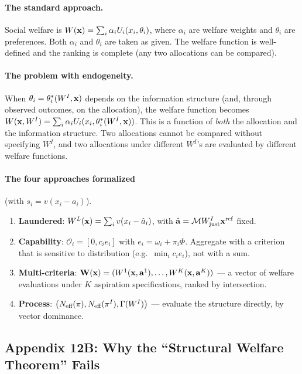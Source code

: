 \documentclass[../structural_economics_book.tex]{subfiles}
\begin{document}
\paragraph{The standard approach.} Social welfare is $W(\mathbf{x}) = \sum_i \alpha_i U_i(x_i, \theta_i)$, where $\alpha_i$ are welfare weights and $\theta_i$ are preferences. Both $\alpha_i$ and $\theta_i$ are taken as given. The welfare function is well-defined and the ranking is complete (any two allocations can be compared).

\paragraph{The problem with endogeneity.} When $\theta_i = \theta_i^*(W^I, \mathbf{x})$ depends on the information structure (and, through observed outcomes, on the allocation), the welfare function becomes $W(\mathbf{x}, W^I) = \sum_i \alpha_i U_i(x_i, \theta_i^*(W^I, \mathbf{x}))$. This is a function of \textit{both} the allocation and the information structure. Two allocations cannot be compared without specifying $W^I$, and two allocations under different $W^I$'s are evaluated by different welfare functions.

\paragraph{The four approaches formalized} (with $s_i = v(x_i - a_i)$).
\begin{enumerate}
\item \textbf{Laundered}: $W^L(\mathbf{x}) = \sum_i v(x_i - \hat{a}_i)$, with $\hat{\mathbf{a}} = \mathcal{M}W^I_{\text{just}}\mathbf{x}^{\text{ref}}$ fixed.
\item \textbf{Capability}: $\mathcal{O}_i = [0, c_i e_i]$ with $e_i = \omega_i + \pi_i\Phi$. Aggregate with a criterion that is sensitive to distribution (e.g.\ $\min_i c_i e_i$), not with a sum.
\item \textbf{Multi-criteria}: $\mathbf{W}(\mathbf{x}) = (W^1(\mathbf{x}, \mathbf{a}^1), \ldots, W^K(\mathbf{x}, \mathbf{a}^K))$ --- a vector of welfare evaluations under $K$ aspiration specifications, ranked by intersection.
\item \textbf{Process}: $\big(N_{\text{eff}}(\pi), N_{\text{eff}}(\pi^I), \Gamma(W^I)\big)$ --- evaluate the structure directly, by vector dominance.
\end{enumerate}


\subsection*{Appendix 12B: Why the ``Structural Welfare Theorem'' Fails}
\label{ch12:app:proof}
\end{document}
